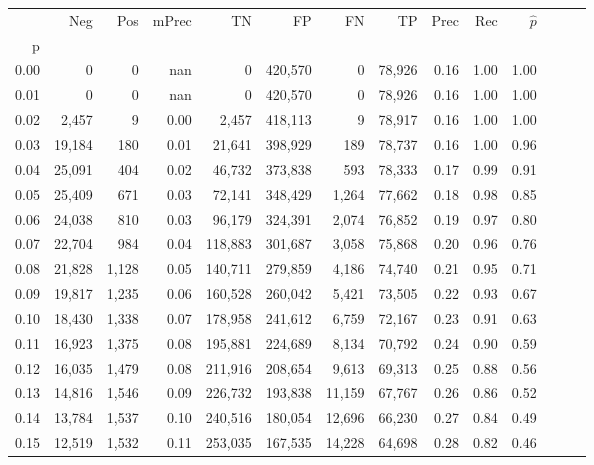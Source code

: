 \begin{tabular}{rrrrrrrrrrrrrr}
\toprule
{} &     Neg &    Pos & mPrec &       TN &       FP &      FN &      TP &  Prec &   Rec & $\hat{p}$ \\
p    &         &        &       &          &          &         &         &       &       &           \\
\midrule
0.00 &       0 &      0 &   nan &        0 &  420,570 &       0 &  78,926 &  0.16 &  1.00 &      1.00 \\
0.01 &       0 &      0 &   nan &        0 &  420,570 &       0 &  78,926 &  0.16 &  1.00 &      1.00 \\
0.02 &   2,457 &      9 &  0.00 &    2,457 &  418,113 &       9 &  78,917 &  0.16 &  1.00 &      1.00 \\
0.03 &  19,184 &    180 &  0.01 &   21,641 &  398,929 &     189 &  78,737 &  0.16 &  1.00 &      0.96 \\
0.04 &  25,091 &    404 &  0.02 &   46,732 &  373,838 &     593 &  78,333 &  0.17 &  0.99 &      0.91 \\
0.05 &  25,409 &    671 &  0.03 &   72,141 &  348,429 &   1,264 &  77,662 &  0.18 &  0.98 &      0.85 \\
0.06 &  24,038 &    810 &  0.03 &   96,179 &  324,391 &   2,074 &  76,852 &  0.19 &  0.97 &      0.80 \\
0.07 &  22,704 &    984 &  0.04 &  118,883 &  301,687 &   3,058 &  75,868 &  0.20 &  0.96 &      0.76 \\
0.08 &  21,828 &  1,128 &  0.05 &  140,711 &  279,859 &   4,186 &  74,740 &  0.21 &  0.95 &      0.71 \\
0.09 &  19,817 &  1,235 &  0.06 &  160,528 &  260,042 &   5,421 &  73,505 &  0.22 &  0.93 &      0.67 \\
0.10 &  18,430 &  1,338 &  0.07 &  178,958 &  241,612 &   6,759 &  72,167 &  0.23 &  0.91 &      0.63 \\
0.11 &  16,923 &  1,375 &  0.08 &  195,881 &  224,689 &   8,134 &  70,792 &  0.24 &  0.90 &      0.59 \\
0.12 &  16,035 &  1,479 &  0.08 &  211,916 &  208,654 &   9,613 &  69,313 &  0.25 &  0.88 &      0.56 \\
0.13 &  14,816 &  1,546 &  0.09 &  226,732 &  193,838 &  11,159 &  67,767 &  0.26 &  0.86 &      0.52 \\
0.14 &  13,784 &  1,537 &  0.10 &  240,516 &  180,054 &  12,696 &  66,230 &  0.27 &  0.84 &      0.49 \\
0.15 &  12,519 &  1,532 &  0.11 &  253,035 &  167,535 &  14,228 &  64,698 &  0.28 &  0.82 &      0.46 \\

\end{tabular}
